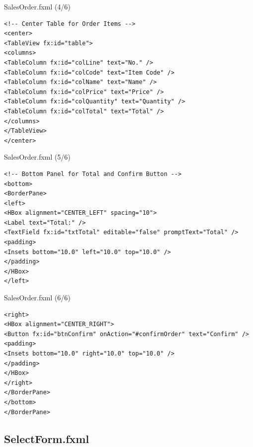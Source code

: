 \documentclass[aspectratio=169, table]{beamer}
\begin{document}
\begin{frame}[fragile]{SalesOrder.fxml (4/6)}
\vspace{20pt}
\begin{lstlisting}[style=XmlStyle]
<!-- Center Table for Order Items -->
<center>
<TableView fx:id="table">
<columns>
<TableColumn fx:id="colLine" text="No." />
<TableColumn fx:id="colCode" text="Item Code" />
<TableColumn fx:id="colName" text="Name" />
<TableColumn fx:id="colPrice" text="Price" />
<TableColumn fx:id="colQuantity" text="Quantity" />
<TableColumn fx:id="colTotal" text="Total" />
</columns>
</TableView>
</center>
\end{lstlisting}
\end{frame}

\begin{frame}[fragile]{SalesOrder.fxml (5/6)}
\vspace{20pt}
\begin{lstlisting}[style=XmlStyle]
<!-- Bottom Panel for Total and Confirm Button -->
<bottom>
<BorderPane>
<left>
<HBox alignment="CENTER_LEFT" spacing="10">
<Label text="Total:" />
<TextField fx:id="txtTotal" editable="false" promptText="Total" />
<padding>
<Insets bottom="10.0" left="10.0" top="10.0" />
</padding>
</HBox>
</left>
\end{lstlisting}
\end{frame}

\begin{frame}[fragile]{SalesOrder.fxml (6/6)}
\vspace{20pt}
\begin{lstlisting}[style=XmlStyle]
<right>
<HBox alignment="CENTER_RIGHT">
<Button fx:id="btnConfirm" onAction="#confirmOrder" text="Confirm" />
<padding>
<Insets bottom="10.0" right="10.0" top="10.0" />
</padding>
</HBox>
</right>
</BorderPane>
</bottom>
</BorderPane>
\end{lstlisting}
\end{frame}

\subsection{SelectForm.fxml}
\end{document}
